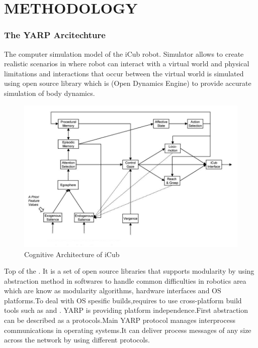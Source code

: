 \documentclass[a4paper, 11pt]{report}
\begin{document}
  \chapter{METHODOLOGY}
  
  \subsection{The YARP Arcitechture}
  The computer simulation model of the iCub robot. Simulator allows to 
  create realistic scenarios in where robot can interact with a virtual world 
  and 
  physical limitations and interactions that occur between the virtual world is 
  simulated using open source library which is \cite{ODE} (Open Dynamics 
  Engine) 
  to 
  provide accurate simulation of body dynamics.
  
  \begin{figure}[h!]
    \centering
    \includegraphics[width=1.0\linewidth]{cognitive_architecture}
    \caption{Cognitive Architecture of iCub}
    \label{fig:cognitive_architecture}
  \end{figure}
  
  Top of the \cite{YARP}. It is a set of open source 
  libraries that supports modularity by using abstraction method in softwares 
  to 
  handle common difficulties in robotics area which are know as modularity 
  algorithms, hardware interfaces and OS platforms.To deal with OS 
  spesific 
  builds,requires to use cross-platform build tools such as \cite{CMake} and 
  \cite{ACE}.
  YARP is providing platform independence.First abstraction can be described as 
  a 
  protocols.Main YARP protocol manages interprocess communications in 
  operating 
  systems.It can deliver process messages of any size across the network by 
  using 
  different protocols.
  
\end{document}

